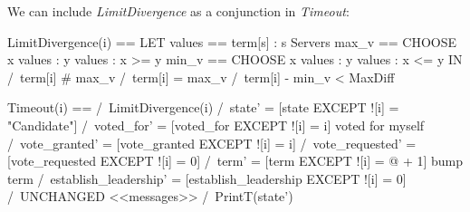 \documentclass{report}
\begin{document}
We can include \textit{LimitDivergence} as a conjunction in
\textit{Timeout}:\newline
\begin{tla}
LimitDivergence(i) == 
    LET 
        values == {term[s] : s \in Servers}
        max_v == CHOOSE x \in values : \A y \in values : x >= y
        min_v == CHOOSE x \in values : \A y \in values : x <= y
    IN 
        \/ /\ term[i] # max_v
        \/ /\ term[i] = max_v 
           /\ term[i] - min_v < MaxDiff

Timeout(i) == 
    /\ LimitDivergence(i)
    /\ state' = [state EXCEPT ![i] = "Candidate"]
    /\ voted_for' = [voted_for EXCEPT ![i] = i]             \* voted for myself
    /\ vote_granted' = [vote_granted EXCEPT ![i] = {i}]
    /\ vote_requested' = [vote_requested EXCEPT ![i] = 0]
    /\ term' = [term EXCEPT ![i] = @ + 1]                   \* bump term
    /\ establish_leadership' = [establish_leadership EXCEPT ![i] = 0]
    /\ UNCHANGED <<messages>>
    \* /\ PrintT(state')
\end{tla}
\begin{tlatex}
%
%
%
%
%
%
%
\@pvspace{8.0pt}%
%
%
%
\@xx{}%
%
\@xx{}%
%
%
%
\@xx{}%
\end{tlatex}
\end{document}
